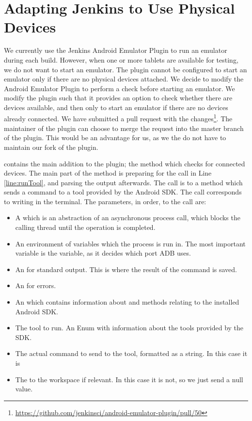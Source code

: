 \section{Adapting Jenkins to Use Physical Devices}
We currently use the Jenkins Android Emulator Plugin to run an emulator during each build. However, when one or more tablets are available for testing, we do not want to start an emulator. The plugin cannot be configured to start an emulator only if there are no physical devices attached. We decide to modify the Android Emulator Plugin to perform a check before starting an emulator. We modify the plugin such that it provides an option to check whether there are devices available, and then only to start an emulator if there are no devices already connected. We have submitted a pull request with the changes\footnote{\url{https://github.com/jenkinsci/android-emulator-plugin/pull/50}}. The maintainer of the plugin can choose to merge the request into the master branch of the plugin. This would be an advantage for us, as we the do not have to maintain our fork of the plugin.

 contains the main addition to the plugin; the method which checks for connected devices. The main part of the method is preparing for the call in Line \ref{line:runTool}, and parsing the output afterwards. The call is to a method which sends a command to a tool provided by the Android SDK. The call corresponds to writing  in the terminal. The parameters, in order, to the call are:

\begin{itemize}
  \item A  which is an abstraction of an asynchronous process call, which blocks the calling thread until the operation is completed.
  \item An environment of variables which the process is run in. The most important variable is the  variable, as it decides which port ADB uses.
  \item An  for standard output. This is where the result of the command is saved.
  \item An  for errors.
  \item An  which contains information about and methods relating to the installed Android SDK.
  \item The tool to run. An Enum with information about the tools provided by the SDK.
  \item The actual command to send to the tool, formatted as a string. In this case it is 
  \item The  to the workspace if relevant. In this case it is not, so we just send a null value. 
\end{itemize}


